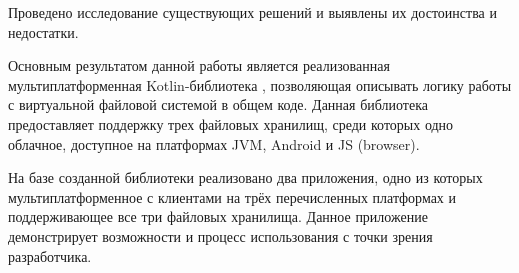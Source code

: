 

Проведено исследование существующих решений и выявлены их достоинства и недостатки.

Основным результатом данной работы является реализованная мультиплатформенная Kotlin-библиотека , позволяющая описывать логику работы с виртуальной файловой системой в общем коде. Данная библиотека предоставляет поддержку трех файловых хранилищ, среди которых одно облачное, доступное на платформах JVM, Android и JS (browser). 

На базе созданной библиотеки реализовано два приложения, одно из которых мультиплатформенное с клиентами на трёх перечисленных платформах и поддерживающее все три файловых хранилища. Данное приложение демонстрирует возможности и процесс использования  с точки зрения разработчика.
